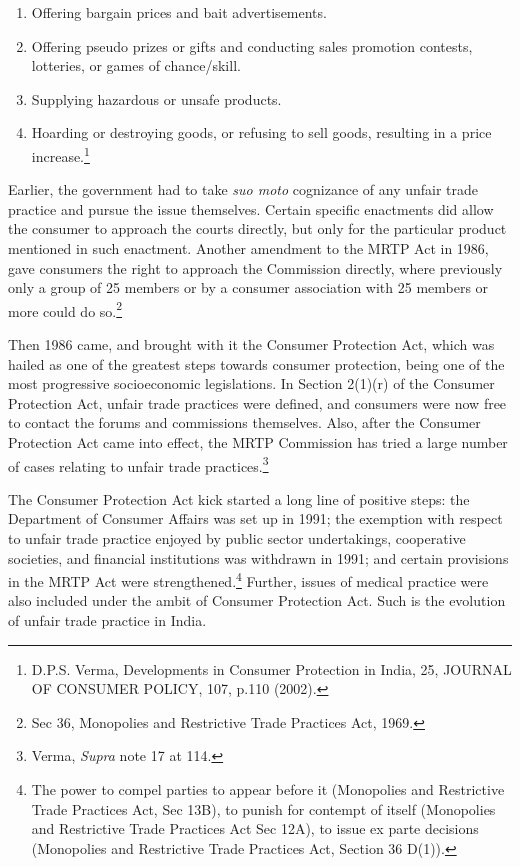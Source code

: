 \begin{multicols}{2}
\begin{enumerate}
\item[2)] Offering bargain prices and bait advertisements.

\item[3)] Offering pseudo prizes or gifts and conducting sales promotion contests, lotteries, or games of chance/skill.

\item[4)] Supplying hazardous or unsafe products.

\item[5)] Hoarding or destroying goods, or refusing to sell goods, resulting in a price increase.\footnote{D.P.S. Verma, Developments in Consumer Protection in India, 25, JOURNAL OF CONSUMER POLICY, 107, p.110 (2002).}
\end{enumerate}

\vspace{-.2cm}

\noi
Earlier, the government had to take \textit{suo moto} cognizance of any unfair trade practice and pursue
the issue themselves. Certain specific enactments did allow the consumer to approach the courts
directly, but only for the particular product mentioned in such enactment. Another amendment
to the MRTP Act in 1986, gave consumers the right to approach the Commission directly,
where previously only a group of 25 members or by a consumer association with 25 members
or more could do so.\footnote{Sec 36, Monopolies and Restrictive Trade Practices Act, 1969.}

\vspace{-.1cm}

\noi
Then 1986 came, and brought with it the Consumer Protection Act, which was hailed as one of
the greatest steps towards consumer protection, being one of the most progressive socioeconomic legislations. In Section 2(1)(r) of the Consumer Protection Act, unfair trade practices
were defined, and consumers were now free to contact the forums and commissions
themselves. Also, after the Consumer Protection Act came into effect, the MRTP Commission
has tried a large number of cases relating to unfair trade practices.\footnote{Verma, \textit{Supra} note 17 at 114.}

\vspace{-.1cm}

\noi
The Consumer Protection Act kick started a long line of positive steps: the Department of
Consumer Affairs was set up in 1991; the exemption with respect to unfair trade practice
enjoyed by public sector undertakings, cooperative societies, and financial institutions was
withdrawn in 1991; and certain provisions in the MRTP Act were strengthened.\footnote{The power to compel parties to appear before it (Monopolies and Restrictive Trade Practices Act, Sec 13B),
to punish for contempt of itself (Monopolies and Restrictive Trade Practices Act Sec 12A), to issue ex parte decisions (Monopolies and Restrictive Trade Practices Act, Section 36 D(1)).} Further, issues of medical practice were also included under the ambit of Consumer Protection Act.
Such is the evolution of unfair trade practice in India.


\end{multicols}
